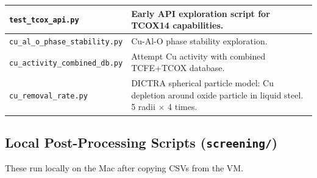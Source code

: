 \documentclass[11pt]{article}
\begin{document}
\begin{table}[H]
\begin{tabular}{|p{2.6in}|p{3.4in}|}
\hline
\rowcolor{altrow}
\texttt{test\_tcox\_api.py} & Early API exploration script for TCOX14 capabilities. \\
\hline
\texttt{cu\_al\_o\_phase\_stability.py} & Cu-Al-O phase stability exploration. \\
\hline
\rowcolor{altrow}
\texttt{cu\_activity\_combined\_db.py} & Attempt Cu activity with combined TCFE+TCOX database. \\
\hline
\rowcolor{altrow}
\texttt{cu\_removal\_rate.py} & DICTRA spherical particle model: Cu depletion around oxide particle in liquid steel. 5 radii $\times$ 4 times. \\
\hline
\end{tabular}
\end{table}

\subsection{Local Post-Processing Scripts (\texttt{screening/})}

These run locally on the Mac after copying CSVs from the VM.
\end{document}
